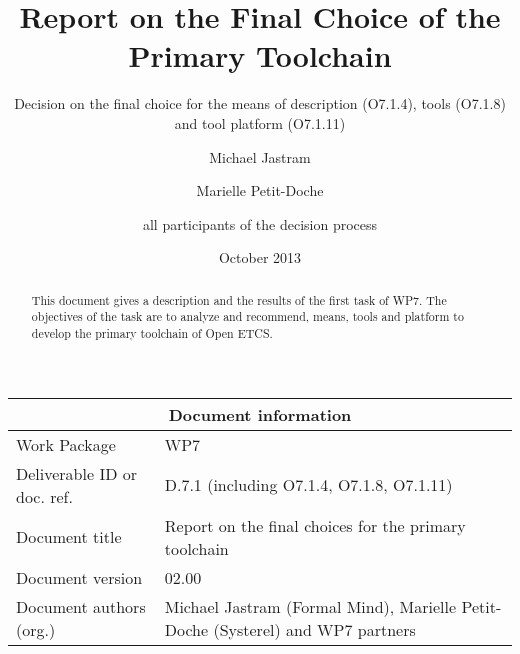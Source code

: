 \documentclass{template/openetcs_report}
\begin{document}
\frontmatter
{}




\title{Report on the Final Choice of the Primary Toolchain }

\subtitle{ Decision on the final choice for the means of description (O7.1.4), tools (O7.1.8) and tool platform (O7.1.11)}

\date{October 2013}


\author{Michael Jastram}

\author{Marielle Petit-Doche}

\author{all participants of the decision process}

 

\begin{abstract}
This document gives  a description and the results of the first task of WP7. The objectives of the task are to analyze and recommend, means, tools and platform to develop the primary toolchain of Open ETCS.

\end{abstract}

\maketitle
\tableofcontents
\listoffiguresandtables
\newpage


\begin{tabular}{|p{4.4cm}|p{8.7cm}|}
\hline
\multicolumn{2}{|c|}{Document information} \\
\hline
Work Package &  WP7  \\
Deliverable ID or doc. ref. & D.7.1 (including O7.1.4, O7.1.8, O7.1.11) \\
\hline
Document title & Report on the final choices for the primary toolchain \\
Document version & 02.00 \\
Document authors (org.)  & Michael Jastram (Formal Mind), Marielle Petit-Doche (Systerel) and WP7 partners  \\
\hline
\end{tabular}
\end{document}
